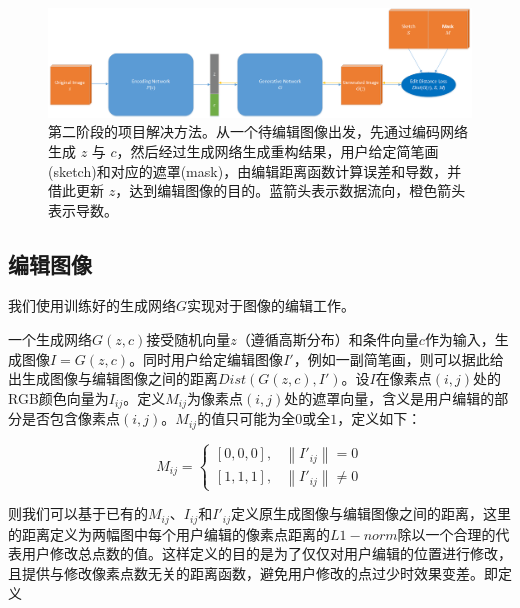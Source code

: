 \documentclass[a4paper,12pt,UTF8]{ctexart}
\newcommand{\norm}[1]{\left\lVert#1\right\rVert}
\newcommand{\kai}{\CJKfamily{zhkai}}	%
\begin{document}
\begin{figure}[H]
  \centering
  \includegraphics[width=1\linewidth]{figs/workflow2.png}
  \caption{\kai 第二阶段的项目解决方法。从一个待编辑图像出发，先通过编码网络生成 $z$ 与 $c$，然后经过生成网络生成重构结果，用户给定简笔画(sketch)和对应的遮罩(mask)，由编辑距离函数计算误差和导数，并借此更新 $z$，达到编辑图像的目的。蓝箭头表示数据流向，橙色箭头表示导数。}
  \label{fig:workflow2}
\end{figure}

\subsection{编辑图像}

我们使用训练好的生成网络$G$实现对于图像的编辑工作。

一个生成网络$G(z, c)$接受随机向量$z$（遵循高斯分布）和条件向量$c$作为输入，生成图像$I = G(z, c)$。同时用户给定编辑图像$I'$，例如一副简笔画，则可以据此给出生成图像与编辑图像之间的距离$Dist(G(z, c), I')$。设$I$在像素点$(i, j)$处的RGB颜色向量为$I_{ij}$。定义$M_{ij}$为像素点$(i, j)$处的遮罩向量，含义是用户编辑的部分是否包含像素点$(i, j)$。$M_{ij}$的值只可能为全$0$或全$1$，定义如下：

\begin{equation}
  M_{ij} =
  \begin{cases}
    [0, 0, 0],   &  \text{$\norm{I'_{ij}} = 0$} \\
    [1, 1, 1],   &  \text{$\norm{I'_{ij}} \neq 0$}
  \end{cases}
\end{equation}

则我们可以基于已有的$M_{ij}$、$I_{ij}$和$I'_{ij}$定义原生成图像与编辑图像之间的距离，这里的距离定义为两幅图中每个用户编辑的像素点距离的$L1-norm$除以一个合理的代表用户修改总点数的值。这样定义的目的是为了仅仅对用户编辑的位置进行修改，且提供与修改像素点数无关的距离函数，避免用户修改的点过少时效果变差。即定义
\end{document}
